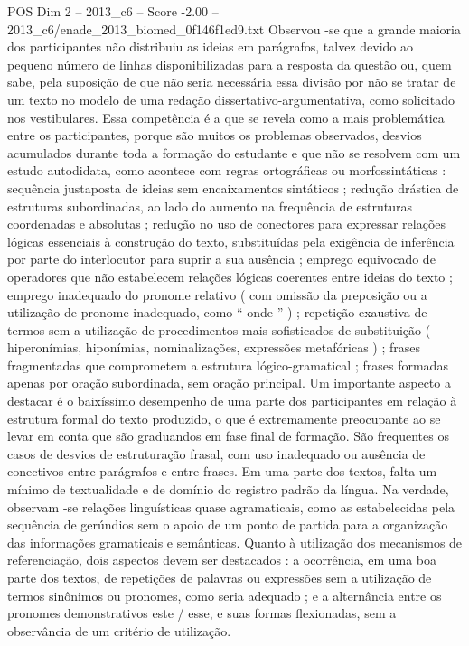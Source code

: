 \begin{textsample}{POS Dim 2 – 2013\_c6 – Score -2.00 – 2013\_c6/enade\_2013\_biomed\_0f146f1ed9.txt}
Observou -se que a grande maioria dos participantes não distribuiu as ideias em parágrafos, talvez devido ao pequeno número de linhas disponibilizadas para a resposta da questão ou, quem sabe, pela suposição de que não seria necessária essa divisão por não se tratar de um texto no modelo de uma redação dissertativo-argumentativa, como solicitado nos vestibulares.
Essa competência é a que se revela como a mais problemática entre os participantes, porque são muitos os problemas observados, desvios acumulados durante toda a formação do estudante e que não se resolvem com um estudo autodidata, como acontece com regras ortográficas ou morfossintáticas : sequência justaposta de ideias sem encaixamentos sintáticos ; redução drástica de estruturas subordinadas, ao lado do aumento na frequência de estruturas coordenadas e absolutas ; redução no uso de conectores para expressar relações lógicas essenciais à construção do texto, substituídas pela exigência de inferência por parte do interlocutor para suprir a sua ausência ; emprego equivocado de operadores que não estabelecem relações lógicas coerentes entre ideias do texto ; emprego inadequado do pronome relativo ( com omissão da preposição ou a utilização de pronome inadequado, como “ onde ” ) ; repetição exaustiva de termos sem a utilização de procedimentos mais sofisticados de substituição ( hiperonímias, hiponímias, nominalizações, expressões metafóricas ) ; frases fragmentadas que comprometem a estrutura lógico-gramatical ; frases formadas apenas por oração subordinada, sem oração principal.
Um importante aspecto a destacar é o baixíssimo desempenho de uma parte dos participantes em relação à estrutura formal do texto produzido, o que é extremamente preocupante ao se levar em conta que são graduandos em fase final de formação.
São frequentes os casos de desvios de estruturação frasal, com uso inadequado ou ausência de conectivos entre parágrafos e entre frases.
Em uma parte dos textos, falta um mínimo de textualidade e de domínio do registro padrão da língua.
Na verdade, observam -se relações linguísticas quase agramaticais, como as estabelecidas pela sequência de gerúndios sem o apoio de um ponto de partida para a organização das informações gramaticais e semânticas.
Quanto à utilização dos mecanismos de referenciação, dois aspectos devem ser destacados : a ocorrência, em uma boa parte dos textos, de repetições de palavras ou expressões sem a utilização de termos sinônimos ou pronomes, como seria adequado ; e a alternância entre os pronomes demonstrativos este / esse, e suas formas flexionadas, sem a observância de um critério de utilização.

\end{textsample}

